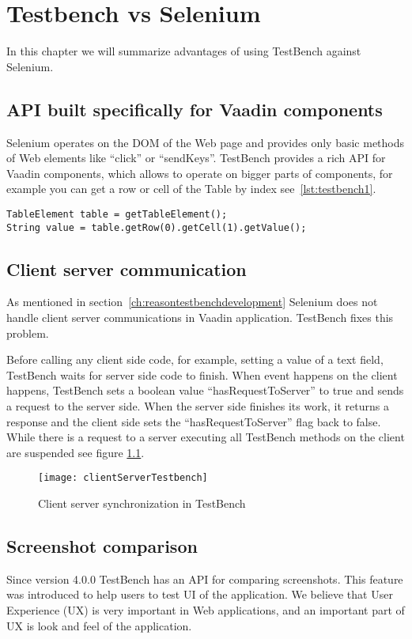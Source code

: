 \chapter{Testbench vs Selenium}
\label{ch:testbenchvsselenium}
In this chapter we will summarize advantages of using TestBench against
Selenium.

\section{API built specifically for Vaadin components}
Selenium operates on the DOM of the Web page and provides only basic methods of
Web elements like ``click'' or ``sendKeys''. TestBench provides a rich API for
Vaadin components, which allows to operate on bigger parts of components, for
 example you can get a row or cell of the Table by index
 see~\ref{lst:testbench1}.
  	\lstset{style=a1listing}
  	\begin{lstlisting}[caption=Get Vaadin Table cell Value,label={lst:testbench1}]
TableElement table = getTableElement();
String value = table.getRow(0).getCell(1).getValue();
	\end{lstlisting}
	
\section{Client server communication}
As mentioned in section~\ref{ch:reasontestbenchdevelopment}
Selenium does not handle client server communications in Vaadin
application. TestBench fixes this problem.

Before calling any client side code, for example, setting a value of a
text field, TestBench waits for server side code to finish. When event happens
on the client happens, TestBench sets a boolean value ``hasRequestToServer'' to
true and sends a request to the server side. When the server side finishes its
work, it returns a response and the client side sets the ``hasRequestToServer''
flag back to false. While there is a request to a server executing all TestBench
methods on the client are suspended see figure \ref{fig:clientServerTestbench}.  
	\begin{figure}
	\centering
	\texttt{[image: clientServerTestbench]}
	\caption{Client server synchronization in TestBench}
	\label{fig:clientServerTestbench}
	\end{figure}

\section{Screenshot comparison}
\label{sec:screencompare}
Since version 4.0.0 TestBench has an API for comparing screenshots. This 
feature was introduced to help users to test UI of the application. We believe
that User Experience (UX) is very important in Web applications, and an
important part of UX is look and feel of the application.

